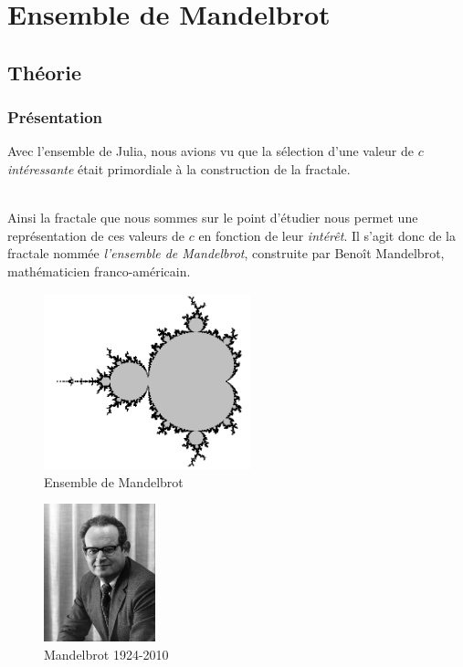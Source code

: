 \documentclass[a4paper,10pt]{report}
\begin{document}
\section{Ensemble de Mandelbrot}
\subsection{Théorie}
\subsubsection{Présentation}
Avec l'ensemble de Julia, nous avions vu que la sélection d'une valeur de $c$ \textit{intéressante} était primordiale à la construction de la fractale. \\ \\
\begin{minipage}[c]{.70\linewidth}
	Ainsi la fractale que nous sommes sur le point d'étudier nous permet une représentation de ces valeurs de $c$ en fonction de leur \textit{intérêt}. Il s'agit donc de la fractale nommée \textit{l'ensemble de Mandelbrot}, construite par Benoît Mandelbrot, mathématicien franco-américain.
\begin{figure}[H]
\centering
\caption{Ensemble de Mandelbrot}
\label{julia}
\centering
\includegraphics[width=6cm]{mandelbrot.png}
\end{figure}	
\end{minipage} \hfill
\begin{minipage}[c]{.05\linewidth}
\end{minipage} \hfill
\begin{minipage}[c]{.21\linewidth}
	\begin{figure}[H]
	\includegraphics[height=4cm]{mr_mandelbrot.jpg}
	\caption{Mandelbrot 1924-2010}
	\end{figure}
\end{minipage}
\end{document}
